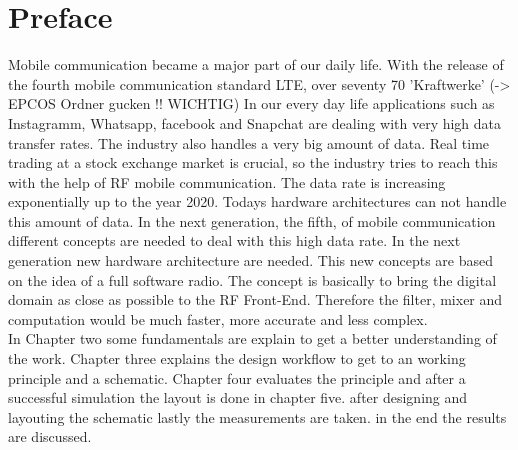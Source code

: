 \chapter{Preface}
Mobile communication became a major part of our daily life. With the release of the fourth mobile communication standard LTE, over seventy 70 'Kraftwerke' (-> EPCOS Ordner gucken !! WICHTIG)
In our every day life applications such as Instagramm, Whatsapp, facebook and Snapchat  are dealing with very high data transfer rates. The industry also handles a very big amount of data. Real time trading at a stock exchange market is crucial, so the industry tries to reach this with the help of RF mobile communication. The data rate is increasing exponentially up to the year 2020. Todays hardware architectures can not handle this amount of data. In the next generation, the fifth, of mobile communication different concepts are needed to deal with this high data rate. In the next generation new hardware architecture are needed. This new concepts are based on the idea of a full software radio. The concept is basically to bring the digital domain as close as possible to the RF Front-End. Therefore the filter, mixer and computation would be much faster, more accurate and less complex. \\
In Chapter two some fundamentals are explain to get a better understanding of the work. Chapter three explains the design workflow to get to an working principle and a schematic. Chapter four evaluates the principle and after a successful simulation the layout is done in chapter five. after designing and layouting the schematic lastly the measurements are taken. in the end the results are discussed.
